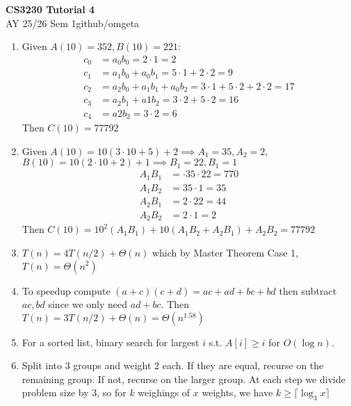 \documentclass[12pt, a4paper]{article}
\newcommand{\mytitle}{CS3230 Tutorial 4}
\newcommand{\myauthor}{github/omgeta}
\newcommand{\mydate}{AY 25/26 Sem 1}
\begin{document}
\raggedright
\footnotesize
\begin{center}
{\normalsize{\textbf{\mytitle}}} \\
{\footnotesize{\mydate\hspace{2pt}\textemdash\hspace{2pt}\myauthor}}
\end{center}
\begin{enumerate}[Q\arabic*).]
  \item Given $A(10) = 352, B(10) = 221$:
    \begin{align*}
      c_0 &= a_0b_0 = 2\cdot 1 = 2\\
      c_1 &= a_1b_0 + a_0b_1 = 5\cdot 1 + 2\cdot 2= 9\\
      c_2 &= a_2b_0 + a_1b_1 + a_0b_2 = 3\cdot 1+ 5\cdot 2 + 2\cdot 2 = 17\\
      c_3 &= a_2b_1 + a1b_2 = 3\cdot 2 + 5\cdot 2 = 16\\
      c_4 &= a2b_2 = 3\cdot 2 = 6
    \end{align*}
    Then $C(10) = 77792$

  \item Given $A(10) = 10(3\cdot 10 + 5) + 2 \implies A_1 = 35, A_2 = 2$, $B(10) = 10(2\cdot 10 + 2) + 1 \implies B_1=22, B_1 =1$
    \begin{align*}
      A_1B_1 &= \cdot 35\cdot 22 = 770\\
      A_1B_2 &= 35\cdot 1 = 35\\
      A_2B_1 &= 2\cdot 22= 44\\
      A_2B_2 &= 2\cdot 1 = 2
    \end{align*}
    Then $C(10) = 10^2(A_1B_1) + 10(A_1B_2+A_2B_1) + A_2B_2 = 77792$
  
  \item $T(n) = 4T(n /2) + \Theta(n)$ which by Master Theorem Case 1, $T(n) = \Theta(n^2)$

  \item To speedup compute $(a+c)(c+d) = ac + ad + bc + bd$ then subtract $ac, bd$ since we only need $ad+bc$. Then $T(n) = 3T(n /2) + \Theta(n) = \Theta(n^{1.58})$

  \item For a sorted list, binary search for largest $i$ s.t. $A[i] \geq i$ for $O(\log n)$.

  \item Split into 3 groups and weight 2 each. If they are equal, recurse on the remaining group. If not, recurse on the larger group. At each step we divide problem size by 3, so for $k$ weighings of $x$ weights, we have $k \geq \lceil\log_3 x\rceil$ 
\end{enumerate}
\end{document}
